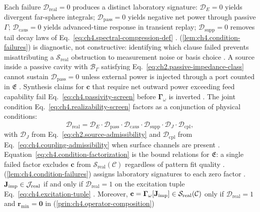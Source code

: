 \label{lem:ch4.condition-failures}
Each failure \(\mathcal{D}_{\mathrm{real}}=0\) produces a distinct laboratory signature:
\(\mathcal{D}_{E}=0\) yields divergent far-sphere integrals;
\(\mathcal{D}_{\mathrm{pass}}=0\) yields negative net power through passive \(\Gamma\);
\(\mathcal{D}_{\mathrm{caus}}=0\) yields advanced-time response in transient replay;
\(\mathcal{D}_{\mathrm{supp}}=0\) removes tail decay laws of Eq.~\eqref{eq:ch4.spectral-compression-def}
\cite{stratton1941}.
(\ref{lem:ch4.condition-failures}) is diagnostic, not constructive: identifying which clause failed prevents
misattributing a $\mathcal{S}_{\mathrm{real}}$ obstruction to measurement noise or basis choice \cite{devaney2004}.
A source inside a passive cavity with \(\mathcal{B}_\Gamma\) satisfying
Eq.~\eqref{eq:ch2.passive-impedance-class} cannot sustain \(\mathcal{D}_{\mathrm{pass}}=0\) unless external
power is injected through a port counted in \(\mathfrak{E}\) \cite{harrington2001}. Synthesis claims
for \(\mathbf{c}\) that require net outward power exceeding feed capability fail
Eq.~\eqref{eq:ch4.passivity-screen} before \(\boldsymbol{\Gamma}_\omega\) is inverted \cite{stratton1941}.
The joint condition Eq.~\eqref{eq:ch4.realizability-screen} factors as a conjunction of physical conditions:
\begin{equation}
\label{eq:ch4.condition-factorization}
\mathcal{D}_{\mathrm{real}}
=
\mathcal{D}_{E}\cdot\mathcal{D}_{\mathrm{pass}}\cdot\mathcal{D}_{\mathrm{caus}}\cdot\mathcal{D}_{\mathrm{supp}}
\cdot\mathcal{D}_{J}\cdot\mathcal{D}_{\mathrm{cpl}},
\end{equation}
with \(\mathcal{D}_{J}\) from Eq.~\eqref{eq:ch2.source-admissibility} and \(\mathcal{D}_{\mathrm{cpl}}\) from
Eq.~\eqref{eq:ch4.coupling-admissibility} when surface channels are present \cite{stratton1941}.
Equation~\eqref{eq:ch4.condition-factorization} is the bound relations for \(\mathfrak{E}\): a single failed factor
excludes \(\mathbf{c}\) from \(\mathcal{S}_{\mathrm{real}}(\mathcal{C})\) regardless of pattern fit quality
\cite{devaney2004}. (\ref{lem:ch4.condition-failures}) assigns laboratory signatures to each zero factor
\cite{harrington2001}.
\label{thm:ch4.condition-composition}
\(\mathbf{J}_{\mathrm{imp}}\in\mathcal{J}_{\mathrm{real}}\) if and only if \(\mathcal{D}_{\mathrm{real}}=1\) on the excitation tuple
Eq.~\eqref{eq:ch4.excitation-tuple} \cite{stratton1941}. Moreover,
\(\mathbf{c}=\boldsymbol{\Gamma}_\omega[\mathbf{J}_{\mathrm{imp}}]\in\mathcal{S}_{\mathrm{real}}(\mathcal{C})\) only if
\(\mathcal{D}_{\mathrm{real}}=1\) and \(\mathbf{r}_{\min}=\mathbf{0}\) in (\ref{prin:ch4.operator-composition})
